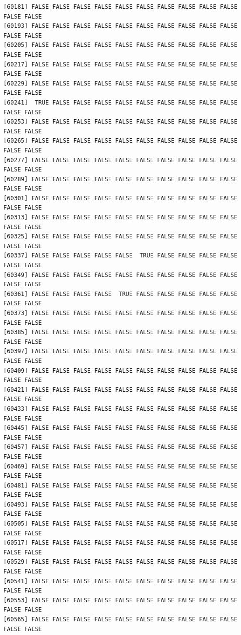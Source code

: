 \documentclass[
  a4paper,
  DIV=11,
  numbers=noendperiod]{scrartcl}
\begin{document}
\begin{verbatim}
[60181] FALSE FALSE FALSE FALSE FALSE FALSE FALSE FALSE FALSE FALSE FALSE FALSE
[60193] FALSE FALSE FALSE FALSE FALSE FALSE FALSE FALSE FALSE FALSE FALSE FALSE
[60205] FALSE FALSE FALSE FALSE FALSE FALSE FALSE FALSE FALSE FALSE FALSE FALSE
[60217] FALSE FALSE FALSE FALSE FALSE FALSE FALSE FALSE FALSE FALSE FALSE FALSE
[60229] FALSE FALSE FALSE FALSE FALSE FALSE FALSE FALSE FALSE FALSE FALSE FALSE
[60241]  TRUE FALSE FALSE FALSE FALSE FALSE FALSE FALSE FALSE FALSE FALSE FALSE
[60253] FALSE FALSE FALSE FALSE FALSE FALSE FALSE FALSE FALSE FALSE FALSE FALSE
[60265] FALSE FALSE FALSE FALSE FALSE FALSE FALSE FALSE FALSE FALSE FALSE FALSE
[60277] FALSE FALSE FALSE FALSE FALSE FALSE FALSE FALSE FALSE FALSE FALSE FALSE
[60289] FALSE FALSE FALSE FALSE FALSE FALSE FALSE FALSE FALSE FALSE FALSE FALSE
[60301] FALSE FALSE FALSE FALSE FALSE FALSE FALSE FALSE FALSE FALSE FALSE FALSE
[60313] FALSE FALSE FALSE FALSE FALSE FALSE FALSE FALSE FALSE FALSE FALSE FALSE
[60325] FALSE FALSE FALSE FALSE FALSE FALSE FALSE FALSE FALSE FALSE FALSE FALSE
[60337] FALSE FALSE FALSE FALSE FALSE  TRUE FALSE FALSE FALSE FALSE FALSE FALSE
[60349] FALSE FALSE FALSE FALSE FALSE FALSE FALSE FALSE FALSE FALSE FALSE FALSE
[60361] FALSE FALSE FALSE FALSE  TRUE FALSE FALSE FALSE FALSE FALSE FALSE FALSE
[60373] FALSE FALSE FALSE FALSE FALSE FALSE FALSE FALSE FALSE FALSE FALSE FALSE
[60385] FALSE FALSE FALSE FALSE FALSE FALSE FALSE FALSE FALSE FALSE FALSE FALSE
[60397] FALSE FALSE FALSE FALSE FALSE FALSE FALSE FALSE FALSE FALSE FALSE FALSE
[60409] FALSE FALSE FALSE FALSE FALSE FALSE FALSE FALSE FALSE FALSE FALSE FALSE
[60421] FALSE FALSE FALSE FALSE FALSE FALSE FALSE FALSE FALSE FALSE FALSE FALSE
[60433] FALSE FALSE FALSE FALSE FALSE FALSE FALSE FALSE FALSE FALSE FALSE FALSE
[60445] FALSE FALSE FALSE FALSE FALSE FALSE FALSE FALSE FALSE FALSE FALSE FALSE
[60457] FALSE FALSE FALSE FALSE FALSE FALSE FALSE FALSE FALSE FALSE FALSE FALSE
[60469] FALSE FALSE FALSE FALSE FALSE FALSE FALSE FALSE FALSE FALSE FALSE FALSE
[60481] FALSE FALSE FALSE FALSE FALSE FALSE FALSE FALSE FALSE FALSE FALSE FALSE
[60493] FALSE FALSE FALSE FALSE FALSE FALSE FALSE FALSE FALSE FALSE FALSE FALSE
[60505] FALSE FALSE FALSE FALSE FALSE FALSE FALSE FALSE FALSE FALSE FALSE FALSE
[60517] FALSE FALSE FALSE FALSE FALSE FALSE FALSE FALSE FALSE FALSE FALSE FALSE
[60529] FALSE FALSE FALSE FALSE FALSE FALSE FALSE FALSE FALSE FALSE FALSE FALSE
[60541] FALSE FALSE FALSE FALSE FALSE FALSE FALSE FALSE FALSE FALSE FALSE FALSE
[60553] FALSE FALSE FALSE FALSE FALSE FALSE FALSE FALSE FALSE FALSE FALSE FALSE
[60565] FALSE FALSE FALSE FALSE FALSE FALSE FALSE FALSE FALSE FALSE FALSE FALSE

\end{verbatim}
\end{document}
